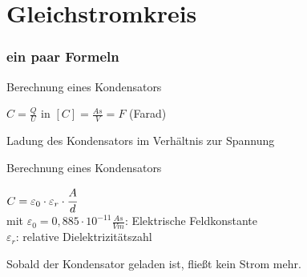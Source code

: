 \section*{Gleich\-strom\-kreis}
\begin{frame}
	\frametitle{ein paar Formeln}
	\begin{block}{Berechnung eines Kondensators}
	  \begin{center}
	    \huge{$C = \frac{Q}{U}$} in $[C] = \frac{As}{V} = F$ (Farad)
	  \end{center}
	  Ladung des Kondensators im Verhältnis zur Spannung
	\end{block}
	\begin{block}{Berechnung eines Kondensators}
	  \begin{center}
	    \huge{$C= \varepsilon_{0} \cdot \varepsilon_{r} \cdot \cfrac{A}{d}$}\\
	      \small{mit $\varepsilon_{0} = 0,885 \cdot 10^{-11} \frac{As}{Vm}$: Elektrische Feldkonstante\\
	      $\varepsilon_{r}$: relative Dielektrizitätszahl}
	  \end{center}
	\end{block}
	Sobald der Kondensator geladen ist, fließt kein Strom mehr.
\end{frame}

